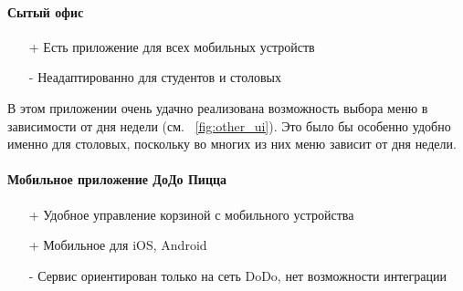\documentclass[14pt]{matmex-diploma-custom}
\begin{document}
	\paragraph{Сытый офис}
	    \begin{itemize}
	        \item[+] Есть приложение для всех мобильных устройств
	        \item[-] Неадаптированно для студентов и столовых
	    \end{itemize}
	    В этом приложении очень удачно реализована возможность выбора меню в зависимости от дня недели (см. ~\ref{fig:other_ui}).
	    Это было бы особенно удобно именно для столовых, поскольку во многих из них меню зависит от дня недели.
	    \newpage
	\paragraph{Мобильное приложение ДоДо Пицца}
	    \begin{itemize}
	        \item[+] Удобное управление корзиной с мобильного устройства
	        \item[+] Мобильное для iOS, Android
	        \item[-] Сервис ориентирован только на сеть DoDo, нет возможности интеграции
	    \end{itemize}
\end{document}
